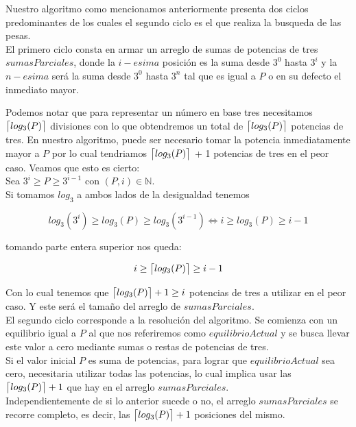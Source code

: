 
Nuestro algoritmo como mencionamos anteriormente presenta dos ciclos predominantes de los cuales el segundo ciclo es el que realiza la busqueda de las pesas.\\

El primero ciclo consta en armar un arreglo de sumas de potencias de tres $sumasParciales$, donde la $i-esima$ posición es la suma desde $3^0$ hasta $3^i$ y la $n-esima$ será la suma desde $3^0$ hasta $3^n$  tal que es igual a $P$ o en su defecto el inmediato mayor. 

Podemos notar que para representar un número en base tres necesitamos $\ceil[\big]{log_3(P)}$ divisiones con lo que obtendremos un total de $\ceil[\big]{log_3(P)}$  potencias de tres. 
En nuestro algoritmo, puede ser necesario tomar la potencia inmediatamente mayor a $P$ por lo cual tendriamos $\ceil[\big]{log_3(P)}$ + 1 potencias de tres en el peor caso. Veamos que esto es cierto:\\

Sea $3^i \geq P  \geq 3^{i-1}$ con $(P, i) \in \mathbb{N}$.\\

Si tomamos $log_3$ a ambos lados de la desigualdad tenemos

\begin{equation}
log_3(3^i) \geq log_3(P)  \geq log_3(3^{i-1}) \iff i \geq log_3(P)  \geq i-1
\end{equation}

tomando parte entera superior nos queda:

\begin{equation}
i \geq \ceil[\big]{log_3(P)}  \geq i-1 
\end{equation}

Con lo cual tenemos que $\ceil[\big]{log_3(P)}+1  \geq i$ potencias de tres a utilizar en el peor caso. Y este será el tamaño del arreglo de $sumasParciales$.\\
 
El segundo ciclo corresponde a la resolución del algoritmo.
Se comienza con un equilibrio igual a $P$ al que nos referiremos como $equilibrioActual$ y se busca llevar este valor a cero mediante sumas o restas de potencias de tres. \\
Si el valor inicial $P$ es suma de potencias, para lograr que $equilibrioActual$ sea cero, necesitaria utilizar todas las potencias, lo cual implica usar las $\ceil[\big]{log_3(P)}+1$ que hay en el arreglo $sumasParciales$. \\
Independientemente de si lo anterior sucede o no, el arreglo $sumasParciales$ se recorre completo, es decir, las $\ceil[\big]{log_3(P)}+1$ posiciones del mismo.\\

